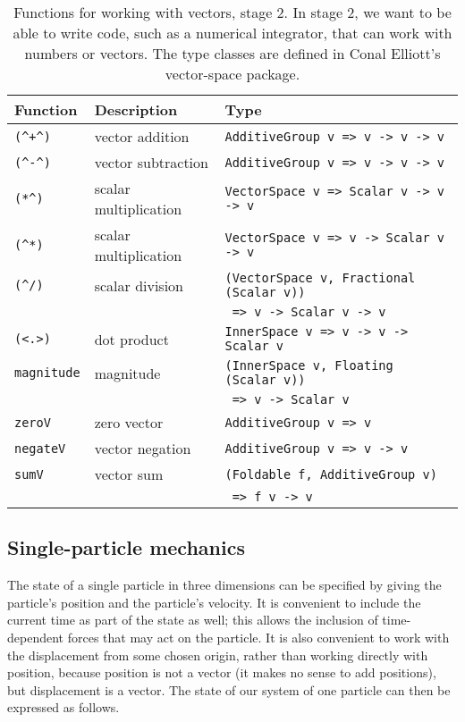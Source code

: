 \documentclass{eptcs}
\begin{document}
\begin{table}
\begin{center}
\begin{tabular}{lll}
Function      & Description           & Type \\ \hline
\verb|(^+^)| & vector addition       & \verb|AdditiveGroup v => v -> v -> v| \\
\verb|(^-^)| & vector subtraction    & \verb|AdditiveGroup v => v -> v -> v| \\
\verb|(*^)|  & scalar multiplication & \verb|VectorSpace v => Scalar v -> v -> v| \\
\verb|(^*)|  & scalar multiplication & \verb|VectorSpace v => v -> Scalar v -> v| \\
\verb|(^/)|  & scalar division       & \verb|(VectorSpace v, Fractional (Scalar v))| \\
              &                      & \verb| => v -> Scalar v -> v| \\
\verb|(<.>)| & dot product           & \verb|InnerSpace v => v -> v -> Scalar v| \\
\verb|magnitude| & magnitude        & \verb|(InnerSpace v, Floating (Scalar v))| \\
              &                      & \verb| => v -> Scalar v| \\
\verb|zeroV| & zero vector          & \verb|AdditiveGroup v => v| \\
\verb|negateV| & vector negation    & \verb|AdditiveGroup v => v -> v| \\
\verb|sumV|   & vector sum          & \verb|(Foldable f, AdditiveGroup v)| \\
               &                     & \verb| => f v -> v| \\
\end{tabular}
\end{center}
\caption{Functions for working with vectors, stage 2.
In stage 2, we want to be able to write code, such as a numerical integrator,
that can work with numbers or vectors.
The type classes are defined in Conal Elliott's vector-space package\cite{vector-space}.
}
\label{vectorfunctionsstage2}
\end{table}

\subsection{Single-particle mechanics}

The state of a single particle in three dimensions can be specified by giving
the particle's position and the particle's velocity.
It is convenient to include the current time as part of the state as well;
this allows the inclusion of time-dependent forces that may act
on the particle.  It is also convenient to work with the displacement
from some chosen origin, rather than working directly with position,
because position is not a vector (it makes no sense to add positions),
but displacement is a vector.  The state of our system of one particle
can then be expressed as follows.
\end{document}
